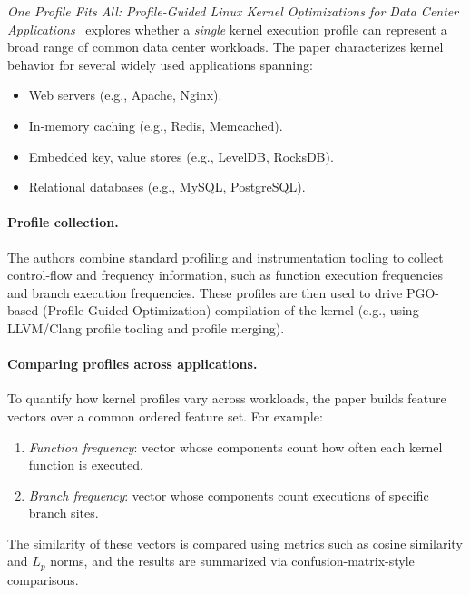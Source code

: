 \emph{One Profile Fits All: Profile-Guided Linux Kernel Optimizations for Data Center Applications}~\cite{one_profile_fits_all} explores whether a \emph{single} kernel execution profile can represent a broad range of common data center workloads.
The paper characterizes kernel behavior for several widely used applications spanning:
\begin{itemize}
    \item Web servers (e.g., Apache, Nginx).
    \item In-memory caching (e.g., Redis, Memcached).
    \item Embedded key, value stores (e.g., LevelDB, RocksDB).
    \item Relational databases (e.g., MySQL, PostgreSQL).
\end{itemize}

\paragraph{Profile collection.}
The authors combine standard profiling and instrumentation tooling to collect control-flow and frequency information, such as function execution frequencies and branch execution frequencies.
These profiles are then used to drive PGO-based (Profile Guided Optimization) compilation of the kernel (e.g., using LLVM/Clang profile tooling and profile merging).

\paragraph{Comparing profiles across applications.}
To quantify how kernel profiles vary across workloads, the paper builds feature vectors over a common ordered feature set.
For example:
\begin{enumerate}
    \item \emph{Function frequency}: vector whose components count how often each kernel function is executed. 
    \item \emph{Branch frequency}: vector whose components count executions of specific branch sites.
\end{enumerate}
The similarity of these vectors is compared using metrics such as cosine similarity and $L_p$ norms, and the results are summarized via confusion-matrix-style comparisons.

